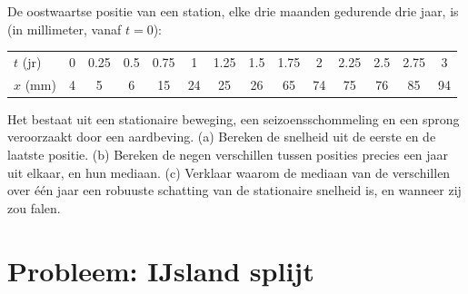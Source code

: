 \begin{exercise}[$\star\star\star$]\label{exo:b1:plate-kinematics:12}
De oostwaartse positie van een station, elke drie maanden gedurende drie jaar, is (in millimeter, vanaf $t = 0$):
\begin{center}\small
\begin{tabular}{l*{13}{c}}
\hline
$t$ (jr) & 0 & 0.25 & 0.5 & 0.75 & 1 & 1.25 & 1.5 & 1.75 & 2 & 2.25 & 2.5 & 2.75 & 3\\
$x$ (mm) & 4 & 5 & 6 & 15 & 24 & 25 & 26 & 65 & 74 & 75 & 76 & 85 & 94\\
\hline
\end{tabular}
\end{center}
Het bestaat uit een stationaire beweging, een seizoensschommeling en een sprong veroorzaakt door een aardbeving. (a) Bereken de snelheid uit de eerste en de laatste positie. (b) Bereken de negen verschillen tussen posities precies een jaar uit elkaar, en hun mediaan. (c) Verklaar waarom de mediaan van de verschillen over één jaar een robuuste schatting van de stationaire snelheid is, en wanneer zij zou falen.
\end{exercise}

\section{Probleem: IJsland splijt}

